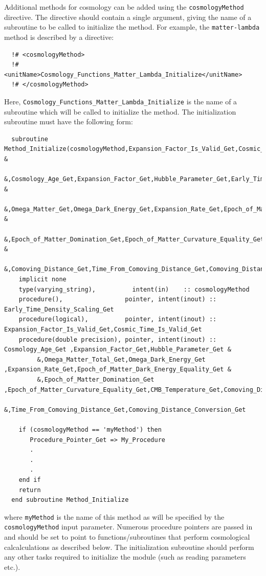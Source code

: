 Additional methods for cosmology can be added using the {\tt cosmologyMethod} directive. The directive should contain a single argument, giving the name of a subroutine to be called to initialize the method. For example, the {\tt matter-lambda} method is described by a directive:
\begin{verbatim}
  !# <cosmologyMethod>
  !#  <unitName>Cosmology_Functions_Matter_Lambda_Initialize</unitName>
  !# </cosmologyMethod>
\end{verbatim}
Here, {\tt Cosmology\_Functions\_Matter\_Lambda\_Initialize} is the name of a subroutine which will be called to initialize the method. The initialization subroutine must have the following form:
\begin{verbatim}
  subroutine Method_Initialize(cosmologyMethod,Expansion_Factor_Is_Valid_Get,Cosmic_Time_Is_Valid_Get &
       &,Cosmology_Age_Get,Expansion_Factor_Get,Hubble_Parameter_Get,Early_Time_Density_Scaling_Get  & 
       &,Omega_Matter_Get,Omega_Dark_Energy_Get,Expansion_Rate_Get,Epoch_of_Matter_Dark_Energy_Equality_Get &
       &,Epoch_of_Matter_Domination_Get,Epoch_of_Matter_Curvature_Equality_Get,CMB_Temperature_Get &
       &,Comoving_Distance_Get,Time_From_Comoving_Distance_Get,Comoving_Distance_Conversion)
    implicit none
    type(varying_string),          intent(in)    :: cosmologyMethod
    procedure(),                 pointer, intent(inout) :: Early_Time_Density_Scaling_Get
    procedure(logical),          pointer, intent(inout) :: Expansion_Factor_Is_Valid_Get,Cosmic_Time_Is_Valid_Get
    procedure(double precision), pointer, intent(inout) :: Cosmology_Age_Get ,Expansion_Factor_Get,Hubble_Parameter_Get &
         &,Omega_Matter_Total_Get,Omega_Dark_Energy_Get ,Expansion_Rate_Get,Epoch_of_Matter_Dark_Energy_Equality_Get &
         &,Epoch_of_Matter_Domination_Get ,Epoch_of_Matter_Curvature_Equality_Get,CMB_Temperature_Get,Comoving_Distance_Get&
         &,Time_From_Comoving_Distance_Get,Comoving_Distance_Conversion_Get

    if (cosmologyMethod == 'myMethod') then
       Procedure_Pointer_Get => My_Procedure
       .
       .
       .
    end if
    return
  end subroutine Method_Initialize
\end{verbatim}
where {\tt myMethod} is the name of this method as will be specified by the {\tt cosmologyMethod} input parameter. Numerous procedure pointers are passed in and should be set to point to functions/subroutines that perform cosmological calcalculations as described below. The initialization subroutine should perform any other tasks required to initialize the module (such as reading parameters etc.).

